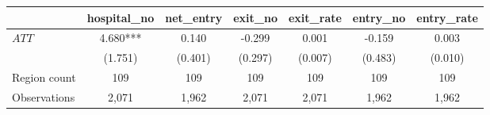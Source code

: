 
\begin{tabular}{lcccccc}
\toprule
 & hospital\_no & net\_entry & exit\_no & exit\_rate & entry\_no & entry\_rate\\
\midrule
$ATT$ & 4.680*** & 0.140 & -0.299 & 0.001 & -0.159 & 0.003\\
 & (1.751) & (0.401) & (0.297) & (0.007) & (0.483) & (0.010)\\
\midrule
Region count & 109 & 109 & 109 & 109 & 109 & 109\\
Observations & 2,071 & 1,962 & 2,071 & 2,071 & 1,962 & 1,962\\
\bottomrule
\end{tabular}
